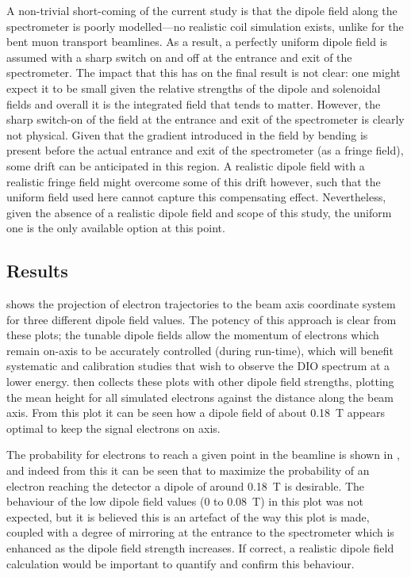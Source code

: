 A non-trivial short-coming of the current study is that the dipole field along the spectrometer is poorly modelled---no realistic coil simulation exists, unlike for the bent muon transport beamlines.
As a result, a perfectly uniform dipole field is assumed with a sharp switch on and off at the entrance and exit of the spectrometer.
The impact that this has on the final result is not clear: one might expect it to be small given the relative strengths of the dipole and solenoidal fields and overall it is the integrated field that tends to matter.
However, the sharp switch-on of the field at the entrance and exit of the spectrometer is clearly not physical.
Given that the gradient introduced in the field by bending is present before the actual entrance and exit of the spectrometer (as a fringe field), some drift can be anticipated in this region.
A realistic dipole field with a realistic fringe field might overcome some of this drift however, such that the uniform field used here cannot capture this compensating effect.
Nevertheless, given the absence of a realistic dipole field and scope of this study, the uniform one is the only available option at this point.

\subsection{Results}
\FigOptimESTDipoleBeamHeightTwoD
\FigOptimESTDipoleBeamHeightMean
{} shows the projection of electron trajectories to the beam axis coordinate system for three different dipole field values.
The potency of this approach is clear from these plots; the tunable dipole fields allow the momentum of electrons which remain on-axis to be accurately controlled (during run-time), which will benefit systematic and calibration studies that wish to observe the \ac{DIO} spectrum at a lower energy.
 then collects these plots with other dipole field strengths, plotting the mean height for all simulated electrons against the distance along the beam axis.
From this plot it can be seen how a dipole field of about 0.18~T appears optimal to keep the signal electrons on axis.

The probability for electrons to reach a given point in the beamline is shown in , and indeed from this it can be seen that to maximize the probability of an electron reaching the detector
a dipole of around 0.18~T is desirable.
The behaviour of the low dipole field values (0 to 0.08~T) in this plot was not expected, but it is believed this is an artefact of the way this plot is made, coupled with a degree of mirroring at the entrance to the spectrometer which is enhanced as the dipole field strength increases.
If correct, a realistic dipole field calculation would be important to quantify and confirm this behaviour.
\FigOptimESTDipoleBeamFluxMean

